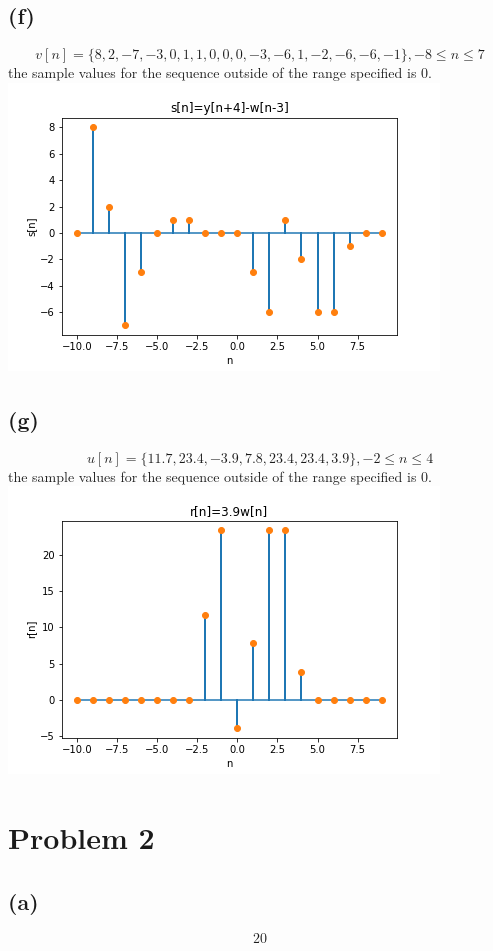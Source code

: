 \subsection*{(f)}
$$\boxed{v[n]=\{8, 2, -7, -3, 0, 1, 1, 0, 0, 0, -3, -6, 1, -2, -6, -6, -1\}, 
-8\leq n \leq7}$$ 
the sample values for the sequence outside of the range specified
is 0.\\
\includegraphics[scale=0.5]{s.png}
\subsection*{(g)}
$$\boxed{u[n]=\{11.7, 23.4, -3.9, 7.8, 23.4, 23.4, 3.9\}, 
-2\leq n \leq4}$$ 
the sample values for the sequence outside of the range specified
is 0.\\
\includegraphics[scale=0.5]{r.png}
\section*{Problem 2}
\subsection*{(a)}
$$\boxed{20}$$
